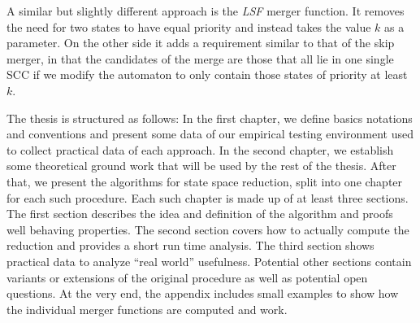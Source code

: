 A similar but slightly different approach is the \emph{LSF} merger function. It removes the need for two states to have equal priority and instead takes the value $k$ as a parameter. On the other side it adds a requirement similar to that of the skip merger, in that the candidates of the merge are those that all lie in one single SCC if we modify the automaton to only contain those states of priority at least $k$.
\vspace{5pt}

The thesis is structured as follows: In the first chapter, we define basics notations and conventions and present some data of our empirical testing environment used to collect practical data of each approach.
In the second chapter, we establish some theoretical ground work that will be used by the rest of the thesis.
After that, we present the algorithms for state space reduction, split into one chapter for each such procedure. Each such chapter is made up of at least three sections. The first section describes the idea and definition of the algorithm and proofs well behaving properties. The second section covers how to actually compute the reduction and provides a short run time analysis. The third section shows practical data to analyze \enquote{real world} usefulness. Potential other sections contain variants or extensions of the original procedure as well as potential open questions. 
At the very end, the appendix includes small examples to show how the individual merger functions are computed and work.






